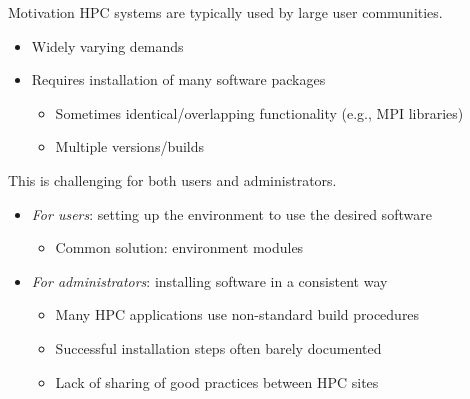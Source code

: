 \documentclass[10pt,xcolor={usenames,dvipsnames}]{beamer}
\begin{document}
\begin{frame}{Motivation}
    HPC systems are typically used by large user communities.
    \begin{itemize}
        \item
            Widely varying demands
        \item
            Requires installation of many software packages
            \begin{itemize}
                \item
                    Sometimes identical/overlapping functionality (e.g., MPI libraries)
                \item
                    Multiple versions/builds
            \end{itemize}
    \end{itemize}
    \medskip
    This is challenging for both users and administrators.
    \begin{itemize}
        \item
            \emph{For users}: setting up the environment to use the desired software
            \begin{itemize}
                \item
                    Common solution: environment modules
            \end{itemize}
        \item
            \emph{For administrators}: installing software in a consistent way
            \begin{itemize}
                \item
                    Many HPC applications use non-standard build procedures
                \item
                    Successful installation steps often barely documented
                \item
                    Lack of sharing of good practices between HPC sites
            \end{itemize}
    \end{itemize}
\end{frame}

\end{document}
